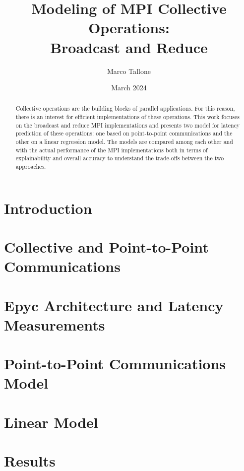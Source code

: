 \documentclass{article}
\title{Modeling of MPI Collective Operations:\\ Broadcast and Reduce}
\author{Marco Tallone}
\date{March 2024}
\begin{document}
\maketitle

\begin{abstract}
\noindent
Collective operations are the building blocks of parallel applications. For this reason, there is an interest for efficient implementations of these operations. This work focuses on the broadcast and reduce MPI implementations and presents two model for latency prediction of these operations: one based on point-to-point communications and the other on a linear regression model.
The models are compared among each other and with the actual performance of the MPI implementations both in terms of explainability and overall accuracy to understand the trade-offs between the two approaches.
\end{abstract}

\section{Introduction}\label{introduction}


\section{Collective and Point-to-Point Communications}\label{algorithms}


\vspace{-5mm}
\section{Epyc Architecture and Latency Measurements}\label{architecture}


\section{Point-to-Point Communications Model}\label{model}


\section{Linear Model}\label{linear}


\pagebreak
\section{Results}\label{results}

\end{document}

